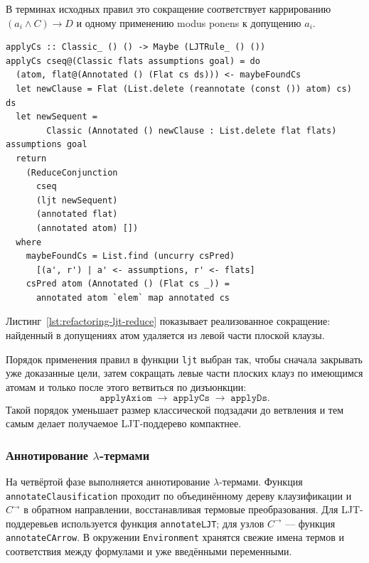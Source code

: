 \documentclass[14pt, russian]{scrartcl}
\begin{document}
В терминах исходных правил это сокращение соответствует каррированию
$(a_i \land C) \rightarrow D$ и одному применению modus ponens к допущению
$a_i$.

\begin{listing}[!htb]
\caption{Локальное объединение каррирования и modus ponens}
\label{lst:refactoring-ljt-reduce}
\begin{verbatim}
applyCs :: Classic_ () () -> Maybe (LJTRule_ () ())
applyCs cseq@(Classic flats assumptions goal) = do
  (atom, flat@(Annotated () (Flat cs ds))) <- maybeFoundCs
  let newClause = Flat (List.delete (reannotate (const ()) atom) cs) ds
  let newSequent =
        Classic (Annotated () newClause : List.delete flat flats) assumptions goal
  return
    (ReduceConjunction
      cseq
      (ljt newSequent)
      (annotated flat)
      (annotated atom) [])
  where
    maybeFoundCs = List.find (uncurry csPred)
      [(a', r') | a' <- assumptions, r' <- flats]
    csPred atom (Annotated () (Flat cs _)) =
      annotated atom `elem` map annotated cs
\end{verbatim}
\end{listing}

Листинг~\ref{lst:refactoring-ljt-reduce} показывает реализованное сокращение:
найденный в допущениях атом удаляется из левой части плоской клаузы.

Порядок применения правил в функции \texttt{ljt} выбран так, чтобы сначала
закрывать уже доказанные цели, затем сокращать левые части плоских клауз по
имеющимся атомам и только после этого ветвиться по дизъюнкции:
\[
\texttt{applyAxiom} \;\rightarrow\; \texttt{applyCs} \;\rightarrow\;
\texttt{applyDs}.
\]
Такой порядок уменьшает размер классической подзадачи до ветвления и тем самым
делает получаемое LJT-поддерево компактнее.

\subsubsection{Аннотирование \texorpdfstring{$\lambda$}{lambda}-термами}

На четвёртой фазе выполняется аннотирование $\lambda$-термами. Функция
\texttt{annotateClausification} проходит по объединённому дереву
клаузификации и $C^{\rightarrow}$ в обратном направлении, восстанавливая
термовые преобразования. Для LJT-поддеревьев используется функция
\texttt{annotateLJT}; для узлов $C^{\rightarrow}$ --- функция
\texttt{annotateCArrow}. В окружении \texttt{Environment} хранятся свежие
имена термов и соответствия между формулами и уже введёнными переменными.
\end{document}

